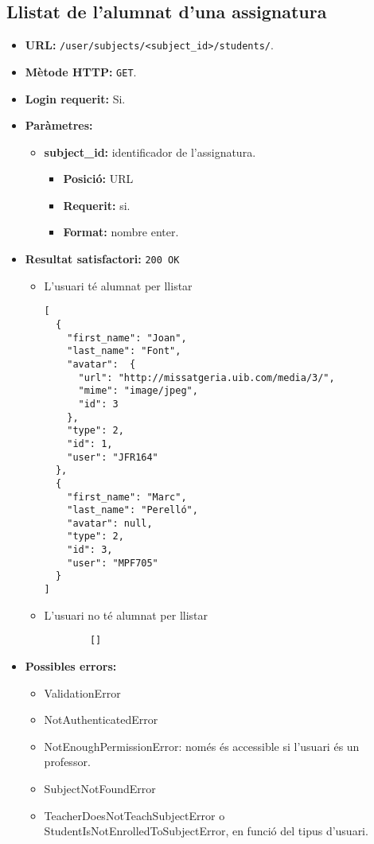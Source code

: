 \subsection{Llistat de l'alumnat d'una assignatura}
\begin{itemize}
\item \textbf{\ac{URL}: } \texttt{/user/subjects/<subject\_id>/students/}.
\item \textbf{Mètode \ac{HTTP}: } \texttt{GET}.
\item \textbf{Login requerit:} Si.
\item \textbf{Paràmetres:}
	\begin{itemize}
		\item \textbf{subject\_id:} identificador de l'assignatura.
		\begin{itemize}
			\item \textbf{Posició:} \ac{URL}
			\item \textbf{Requerit:} si.
			\item \textbf{Format:} nombre enter.
		\end{itemize}
	\end{itemize}
		
\item \textbf{Resultat satisfactori:} \texttt{200 OK}
	\begin{itemize}
		\item L'usuari té alumnat per llistar
		\begin{verbatim}
[
  {
    "first_name": "Joan",
    "last_name": "Font",
    "avatar":  {
      "url": "http://missatgeria.uib.com/media/3/",
      "mime": "image/jpeg",
      "id": 3
    },
    "type": 2,
    "id": 1,
    "user": "JFR164"
  },
  {
    "first_name": "Marc",
    "last_name": "Perelló",
    "avatar": null,
    "type": 2,
    "id": 3,
    "user": "MPF705"
  }
]
		\end{verbatim}
		\item L'usuari no té alumnat per llistar
		\begin{verbatim}
		[]
		\end{verbatim}
	\end{itemize}
\item \textbf{Possibles errors:}
	\begin{itemize}
		\item ValidationError
		\item NotAuthenticatedError
		\item NotEnoughPermissionError: només és accessible si l'usuari és un professor.
		\item SubjectNotFoundError
		\item TeacherDoesNotTeachSubjectError o StudentIsNotEnrolledToSubjectError, en funció del tipus d'usuari.
	\end{itemize}
\end{itemize}

